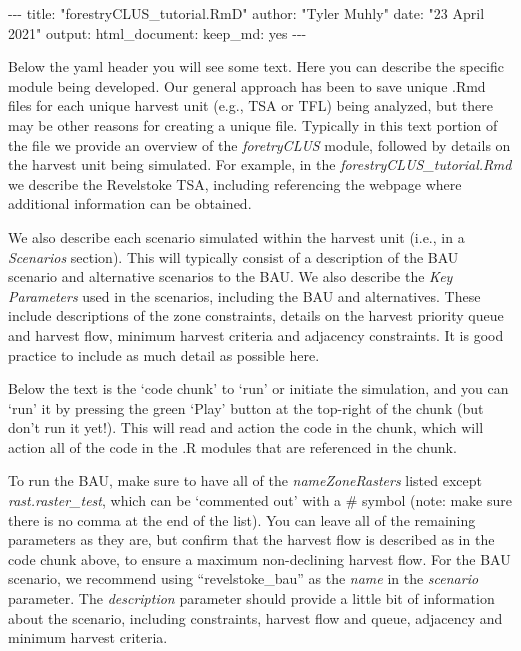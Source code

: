 \documentclass[
]{article}
\newenvironment{Shaded}{\begin{snugshade}}{\end{snugshade}}
\newcommand{\NormalTok}[1]{#1}
\newcommand{\SpecialCharTok}[1]{\textcolor[rgb]{0.00,0.00,0.00}{#1}}
\newcommand{\StringTok}[1]{\textcolor[rgb]{0.31,0.60,0.02}{#1}}
\begin{document}
\begin{Shaded}
\begin{Highlighting}[]
\SpecialCharTok{{-}{-}{-}}
\NormalTok{title}\SpecialCharTok{:} \StringTok{"forestryCLUS\_tutorial.RmD"}
\NormalTok{author}\SpecialCharTok{:} \StringTok{"Tyler Muhly"}
\NormalTok{date}\SpecialCharTok{:} \StringTok{"23 April 2021"}
\NormalTok{output}\SpecialCharTok{:}
\NormalTok{  html\_document}\SpecialCharTok{:} 
\NormalTok{    keep\_md}\SpecialCharTok{:}\NormalTok{ yes}
\SpecialCharTok{{-}{-}{-}}
\end{Highlighting}
\end{Shaded}

Below the yaml header you will see some text. Here you can describe the
specific module being developed. Our general approach has been to save
unique .Rmd files for each unique harvest unit (e.g., TSA or TFL) being
analyzed, but there may be other reasons for creating a unique file.
Typically in this text portion of the file we provide an overview of the
\emph{foretryCLUS} module, followed by details on the harvest unit being
simulated. For example, in the \emph{forestryCLUS\_tutorial.Rmd} we
describe the Revelstoke TSA, including referencing the webpage where
additional information can be obtained.

We also describe each scenario simulated within the harvest unit (i.e.,
in a \emph{Scenarios} section). This will typically consist of a
description of the BAU scenario and alternative scenarios to the BAU. We
also describe the \emph{Key Parameters} used in the scenarios, including
the BAU and alternatives. These include descriptions of the zone
constraints, details on the harvest priority queue and harvest flow,
minimum harvest criteria and adjacency constraints. It is good practice
to include as much detail as possible here.

Below the text is the `code chunk' to `run' or initiate the simulation,
and you can `run' it by pressing the green `Play' button at the
top-right of the chunk (but don't run it yet!). This will read and
action the code in the chunk, which will action all of the code in the
.R modules that are referenced in the chunk.

To run the BAU, make sure to have all of the \emph{nameZoneRasters}
listed except \emph{rast.raster\_test}, which can be `commented out'
with a \# symbol (note: make sure there is no comma at the end of the
list). You can leave all of the remaining parameters as they are, but
confirm that the harvest flow is described as in the code chunk above,
to ensure a maximum non-declining harvest flow. For the BAU scenario, we
recommend using ``revelstoke\_bau'' as the \emph{name} in the
\emph{scenario} parameter. The \emph{description} parameter should
provide a little bit of information about the scenario, including
constraints, harvest flow and queue, adjacency and minimum harvest
criteria.
\end{document}
